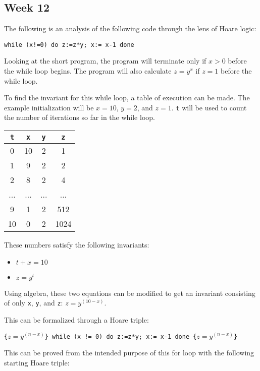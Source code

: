 \documentclass{article}
\theoremstyle{theorem}
\theoremstyle{definition}
\theoremstyle{remark}
\begin{document}
\newpage
\subsection{Week 12}

The following is an analysis of the following code through the lens of Hoare logic:

\texttt{while (x!=0) do z:=z*y;  x:= x-1 done}

Looking at the short program, the program will terminate only if $x > 0$ before the while loop begins. The program will also calculate $z = y^x$ if $z = 1$ before the while loop.

To find the invariant for this while loop, a table of execution can be made. The example initialization will be $x = 10$, $y = 2$, and $z = 1$. \texttt{t} will be used to count the number of iterations so far in the while loop.

\begin{center}
\begin{tabular}{ | c | c | c | c| }
    \hline
    \texttt{t} & \texttt{x} & \texttt{y} & \texttt{z} \\
    \hline\hline
    0 & 10 & 2 & 1 \\ 
    \hline
    1 & 9 & 2 & 2 \\
    \hline
    2 & 8 & 2 & 4 \\
    \hline
    ... & ... & ... & ... \\
    \hline
    9 & 1 & 2 & 512 \\
    \hline
    10 & 0 & 2 & 1024 \\
    \hline
\end{tabular}
\end{center}

These numbers satisfy the following invariants:

\begin{itemize}
    \item $t + x = 10$
    \item $z = y ^ t$
\end{itemize}

Using algebra, these two equations can be modified to get an invariant consisting of only \texttt{x}, \texttt{y}, and \texttt{z}: $z = y^{(10 - x)}$.

This can be formalized through a Hoare triple:

\texttt{\{$z = y^{(n - x)}$\}  while (x != 0) do z:=z*y;  x:= x-1 done  \{$z = y^{(n - x)}$\}}

This can be proved from the intended purpose of this for loop with the following starting Hoare triple:
\end{document}
